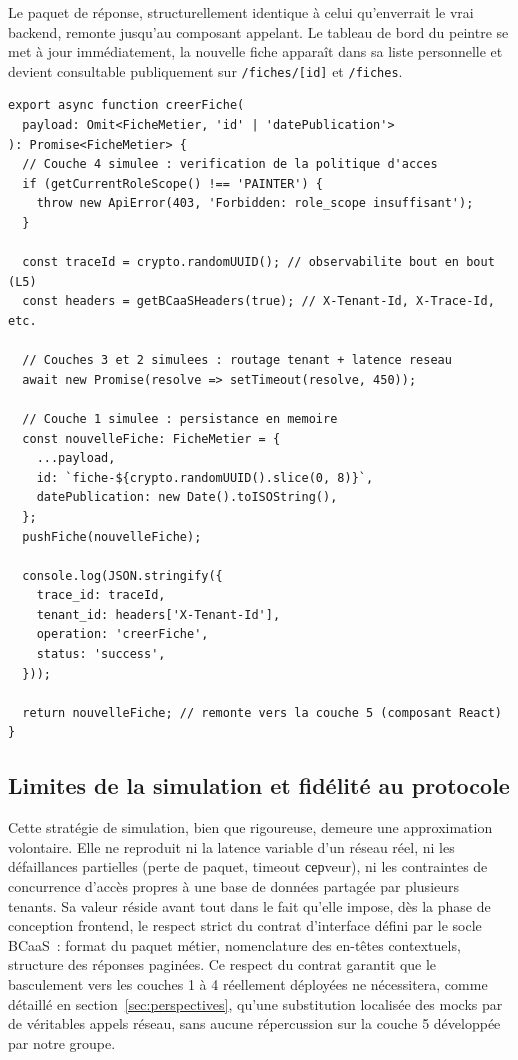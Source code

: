 \documentclass[12pt,a4paper]{report}
\begin{document}
Le paquet de réponse, structurellement identique à celui qu'enverrait le vrai backend, remonte jusqu'au composant appelant. Le tableau de bord du peintre se met à jour immédiatement, la nouvelle fiche apparaît dans sa liste personnelle et devient consultable publiquement sur \texttt{/fiches/[id]} et \texttt{/fiches}.

\begin{lstlisting}[caption={\texttt{lib/api.ts} --- \texttt{creerFiche()}, traversée simulée des couches 4 à 1}]
export async function creerFiche(
  payload: Omit<FicheMetier, 'id' | 'datePublication'>
): Promise<FicheMetier> {
  // Couche 4 simulee : verification de la politique d'acces
  if (getCurrentRoleScope() !== 'PAINTER') {
    throw new ApiError(403, 'Forbidden: role_scope insuffisant');
  }

  const traceId = crypto.randomUUID(); // observabilite bout en bout (L5)
  const headers = getBCaaSHeaders(true); // X-Tenant-Id, X-Trace-Id, etc.

  // Couches 3 et 2 simulees : routage tenant + latence reseau
  await new Promise(resolve => setTimeout(resolve, 450));

  // Couche 1 simulee : persistance en memoire
  const nouvelleFiche: FicheMetier = {
    ...payload,
    id: `fiche-${crypto.randomUUID().slice(0, 8)}`,
    datePublication: new Date().toISOString(),
  };
  pushFiche(nouvelleFiche);

  console.log(JSON.stringify({
    trace_id: traceId,
    tenant_id: headers['X-Tenant-Id'],
    operation: 'creerFiche',
    status: 'success',
  }));

  return nouvelleFiche; // remonte vers la couche 5 (composant React)
}
\end{lstlisting}

\subsection{Limites de la simulation et fidélité au protocole}

Cette stratégie de simulation, bien que rigoureuse, demeure une approximation volontaire. Elle ne reproduit ni la latence variable d'un réseau réel, ni les défaillances partielles (perte de paquet, timeout серveur), ni les contraintes de concurrence d'accès propres à une base de données partagée par plusieurs tenants. Sa valeur réside avant tout dans le fait qu'elle impose, dès la phase de conception frontend, le respect strict du contrat d'interface défini par le socle BCaaS~: format du paquet métier, nomenclature des en-têtes contextuels, structure des réponses paginées. Ce respect du contrat garantit que le basculement vers les couches 1 à 4 réellement déployées ne nécessitera, comme détaillé en section~\ref{sec:perspectives}, qu'une substitution localisée des mocks par de véritables appels réseau, sans aucune répercussion sur la couche 5 développée par notre groupe.
\newpage
\end{document}
